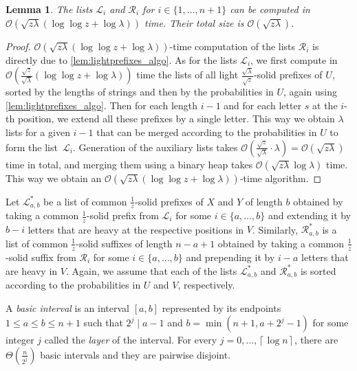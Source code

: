 \documentclass{article}
\theoremstyle{plain}
\newtheorem{lemma}[theorem]{Lemma}
\theoremstyle{definition}
\newcommand{\ceil}[1]{\left\lceil #1 \right\rceil}
\newcommand{\Oh}{\mathcal{O}}
\renewcommand{\L}{\mathcal{L}}
\newcommand{\R}{\mathcal{R}}
\newcommand{\Ls}{\mathcal{L}^*}
\newcommand{\Rs}{\mathcal{R}^*}
\newcommand{\fr}{\ensuremath{\frac1z}}
\newcommand{\mayqed}{}
\begin{document}
   \begin{lemma}\label{lem:L_R}
      The lists $\L_i$ and $\R_i$ for $i \in \{1,\ldots,n+1\}$ can be computed in $\Oh(\sqrt{z\lambda} (\log \log z+\log \lambda))$ time.
      Their total size is $\Oh(\sqrt{z \lambda})$.
    \end{lemma}
      \begin{proof}
        $\Oh(\sqrt{z\lambda} (\log \log z+\log\lambda))$-time computation of the lists $\R_i$ is directly due to \cref{lem:lightprefixes_algo}.
        As for the lists $\L_i$, we first compute in $\Oh(\frac{\sqrt{z}}{\sqrt{\lambda}}(\log \log z+\log\lambda))$ time the lists of all light $\frac{\sqrt{\lambda}}{\sqrt{z}}$-solid prefixes of $U$, sorted by the lengths of strings and then by the probabilities in $U$, again using \cref{lem:lightprefixes_algo}.
        Then for each length $i-1$ and for each letter $s$ at the $i$-th position, we extend all these prefixes by a single letter.
        This way we obtain $\lambda$ lists for a given $i-1$ that can be merged according to the probabilities in $U$ to form the list~$\L_i$.
        Generation of the auxiliary lists takes $\Oh(\frac{\sqrt{z}}{\sqrt{\lambda}}\cdot \lambda)=\Oh(\sqrt{z\lambda})$ time in total,
        and merging them using a binary heap takes $\Oh(\sqrt{z\lambda} \log \lambda)$ time.
        This way we obtain an $\Oh(\sqrt{z\lambda} (\log \log z+\log\lambda))$-time algorithm.
      \mayqed\end{proof}

      Let $\Ls_{a,b}$ be a list of common \fr-solid prefixes of $X$ and $Y$ of length $b$
      obtained by taking a common \fr-solid prefix from $\L_i$ for some $i \in \{a,\ldots,b\}$
      and extending it by $b-i$ letters that are heavy at the respective positions in $V$.
      Similarly, $\Rs_{a,b}$ is a list of common \fr-solid suffixes of length $n-a+1$
      obtained by taking a common \fr-solid suffix from $\R_i$ for some $i \in \{a,\ldots,b\}$
      and prepending it by $i-a$ letters that are heavy in $V$.
      Again, we assume that each of the lists $\Ls_{a,b}$ and $\Rs_{a,b}$ is sorted according to the probabilities in $U$ and $V$, respectively.
      
      A \emph{basic interval} is an interval $[a,b]$ represented by its endpoints $1 \le a \le b \le n+1$ such that
      $2^j \mid a-1$ and $b=\min(n+1,a+2^j-1)$ for some integer $j$ called the \emph{layer} of the interval.
      For every $j=0,\ldots,\ceil{\log n}$, there are $\Theta(\frac{n}{2^j})$ basic intervals and they are pairwise disjoint.
      
\end{document}
